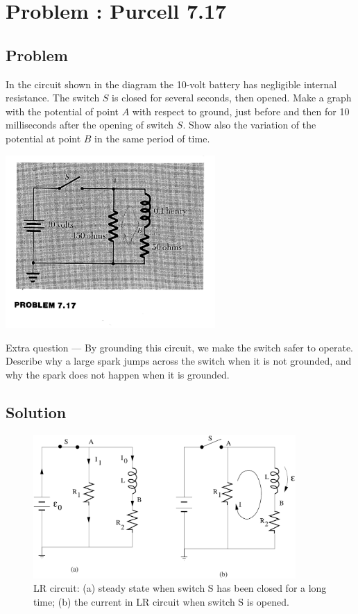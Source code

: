 \documentclass[solutions]{esg8022pset}
\date{\today }
\begin{document}
\section{Problem \thesection: Purcell 7.17}
\subsection{Problem}
  In the circuit shown in the diagram the 10-volt battery has negligible
  internal resistance.  The switch $S$ is closed for several seconds, then
  opened.  Make a graph with the potential of point $A$ with respect to
  ground, just before and then for 10 milliseconds after the opening of
  switch $S$.  Show also the variation of the potential at point $B$ in the
  same period of time.

  \begin{center}
    \includegraphics[width = 0.6\textwidth]{figpu717}
  \end{center}

  Extra question --- By grounding this circuit, we make the switch
  safer to operate. Describe why a large spark jumps across the switch
  when it is not grounded, and why the spark does not happen when it is
  grounded.
\subsection{Solution}
  \begin{figure}[H]
    \centering
    \includegraphics[width = 10cm]{inductance2}
    \caption{LR circuit: (a) steady state when switch S has been closed for a
      long time; (b) the current in LR circuit when switch S is opened.}
    \label{fig:inductance2.eps}
  \end{figure}
\end{document}
